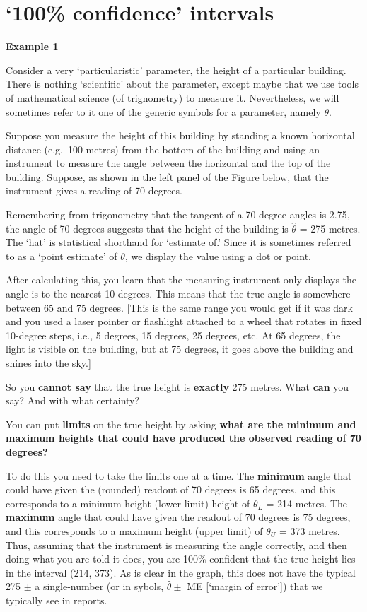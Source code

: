 \documentclass[]{book}
\begin{document}
\hypertarget{confidence-intervals}{%
\section{`100\% confidence' intervals}\label{confidence-intervals}}

\textbf{Example 1}

Consider a very `particularistic' parameter, the height of a particular building. There is nothing `scientific' about the parameter, except maybe that we use tools of mathematical science (of trignometry) to measure it. Nevertheless, we will sometimes refer to it one of the generic symbols for a parameter, namely \(\theta.\)

Suppose you measure the height of this building by standing a known horizontal distance (e.g.~100 metres) from the bottom of the building and using an instrument to measure the angle between the horizontal and the top of the building. Suppose, as shown in the left panel of the Figure below, that the instrument gives a reading of 70 degrees.

Remembering from trigonometry that the tangent of a 70 degree angles is 2.75, the angle of 70 degrees suggests that the height of the building is \(\hat{\theta}\) = 275 metres. The `hat' is statistical shorthand for `estimate of.' Since it is sometimes referred to as a `point estimate' of \(\theta\), we display the value using a dot or point.

After calculating this, you learn that the measuring instrument only displays the angle is to the nearest 10 degrees. This means that the true angle is somewhere between 65 and 75 degrees. {[}This is the same range you would get if it was dark and you used a laser pointer or flashlight attached to a wheel that rotates in fixed 10-degree steps, i.e., 5 degrees, 15 degrees, 25 degrees, etc. At 65 degrees, the light is visible on the building, but at 75 degrees, it goes above the building and shines into the sky.{]}

So you \textbf{cannot say} that the true height is \textbf{exactly} 275 metres. What \textbf{can} you say? And with what certainty?

You can put \textbf{limits} on the true height by asking \textbf{what are the minimum and maximum heights that could have produced the observed reading of 70 degrees?}

To do this you need to take the limits one at a time. The \textbf{minimum} angle that could have given the (rounded) readout of 70 degrees is 65 degrees, and this corresponds to a minimum height (lower limit) height of \(\theta_L\) = 214 metres. The \textbf{maximum} angle that could have given the readout of 70 degrees is 75 degrees, and this corresponds to a maximum height (upper limit) of \(\theta_U\) = 373 metres. Thus, assuming that the instrument is measuring the angle correctly, and then doing what you are told it does, you are 100\% confident that the true height lies in the interval (214, 373). As is clear in the graph, this does not have the typical 275 \(\pm\) a single-number (or in sybols, \(\hat{\theta} \pm\) ME {[}`margin of error'{]}) that we typically see in reports.
\end{document}

